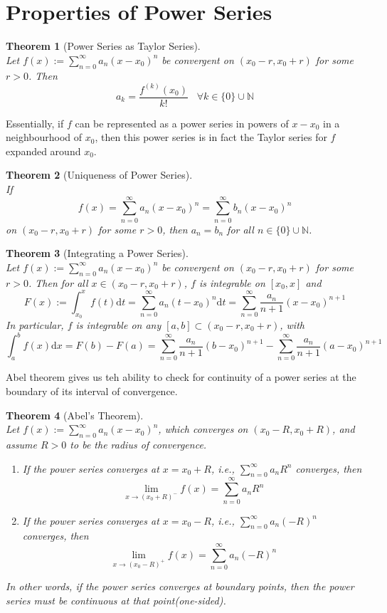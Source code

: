 \documentclass[12pt]{article}
\newcommand{\diff}{\mathrm{d}}
\newtheorem{theorem}{Theorem}[section]
\theoremstyle{definition}
\begin{document}
\section{Properties of Power Series}
\begin{theorem}[Power Series as Taylor Series]
\hfill\\\normalfont Let $f(x):=\sum_{n=0}^\infty a_n(x-x_0)^n$ be convergent on $(x_0-r,x_0+r)$ for some $r>0$. Then
\[
a_k=\frac{f^{(k)}(x_0)}{k!}\;\;\;\forall k\in\{0\}\cup \mathbb{N}
\]
\end{theorem}
Essentially, if $f$ can be represented as a power series in powers of $x-x_0$ in a neighbourhood of $x_0$, then this power series is in fact the Taylor series for $f$ expanded around $x_0$.
\begin{theorem}[Uniqueness of Power Series]
\hfill\\\normalfont If 
\[
f(x)=\sum_{n=0}^\infty a_n(x-x_0)^n=\sum_{n=0}^\infty b_n(x-x_0)^n
\]
on $(x_0-r,x_0+r)$ for some $r>0$, then $a_n=b_n$ for all $n\in\{0\}\cup\mathbb{N}$.
\end{theorem}
\begin{theorem}[Integrating a Power Series]
\hfill\\\normalfont Let $f(x):=\sum_{n=0}^\infty a_n(x-x_0)^n$ be convergent on $(x_0-r,x_0+r)$ for some $r>0$. Then for all $x\in(x_0-r,x_0+r)$, $f$ is integrable on $[x_0,x]$ and
\[
F(x):=\int_{x_0}^x f(t)\diff t=\sum_{n=0}^\infty a_n(t-x_0)^n\diff t=\sum_{n=0}^\infty \frac{a_n}{n+1}(x-x_0)^{n+1}
\]
In particular, $f$ is integrable on any $[a,b]\subset (x_0-r,x_0+r)$, with
\[
\int_a^b f(x)\diff x=F(b)-F(a)=\sum_{n=0}^\infty \frac{a_n}{n+1}(b-x_0)^{n+1}-\sum_{n=0}^\infty \frac{a_n}{n+1}(a-x_0)^{n+1}
\]
\end{theorem}
Abel theorem gives us teh ability to check for continuity of a power series at the boundary of its interval of convergence.
\begin{theorem}[Abel's Theorem]
\hfill\\\normalfont Let $f(x):=\sum_{n=0}^\infty a_n(x-x_0)^n$, which converges on $(x_0-R,x_0+R)$, and assume $R>0$ to be the radius of convergence.
\begin{enumerate}
	\item If the power series converges at $x=x_0+R$, i.e., $\sum_{n=0}^\infty a_nR^n$ converges, then
	\[
\lim_{x\to(x_0+R)^{-}}f(x)=\sum_{n=0}^\infty a_nR^n
	\]
	\item If the power series converges at $x=x_0-R$, i.e., $\sum_{n=0}^\infty a_n(-R)^n$ converges, then
	\[
\lim_{x\to(x_0-R)^{+}}f(x)=\sum_{n=0}^\infty a_n(-R)^n
	\]
\end{enumerate}
In other words, if the power series converges at boundary points, then the power series must be continuous at that point(one-sided).
\end{theorem}
\clearpage
\end{document}
